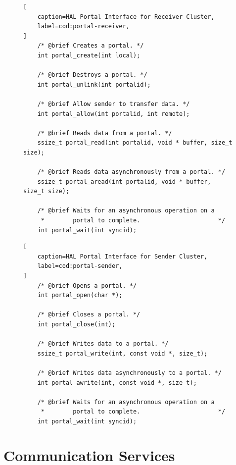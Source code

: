 
\begin{figure}[t]
\begin{lstlisting}[
    caption=HAL Portal Interface for Receiver Cluster,
    label=cod:portal-receiver,
]
	/* @brief Creates a portal. */
    int portal_create(int local);

	/* @brief Destroys a portal. */
    int portal_unlink(int portalid);

    /* @brief Allow sender to transfer data. */
    int portal_allow(int portalid, int remote);

    /* @brief Reads data from a portal. */
    ssize_t portal_read(int portalid, void * buffer, size_t size);

    /* @brief Reads data asynchronously from a portal. */
    ssize_t portal_aread(int portalid, void * buffer, size_t size);

    /* @brief Waits for an asynchronous operation on a
     *        portal to complete.                      */
    int portal_wait(int syncid);
\end{lstlisting}
\end{figure}

\begin{figure}[t]
\begin{lstlisting}[
    caption=HAL Portal Interface for Sender Cluster,
    label=cod:portal-sender,
]
    /* @brief Opens a portal. */
    int portal_open(char *);

	/* @brief Closes a portal. */
    int portal_close(int);

	/* @brief Writes data to a portal. */
    ssize_t portal_write(int, const void *, size_t);

    /* @brief Writes data asynchronously to a portal. */
    int portal_awrite(int, const void *, size_t);
    
    /* @brief Waits for an asynchronous operation on a
     *        portal to complete.                      */
    int portal_wait(int syncid);
\end{lstlisting}
\end{figure}

\section{Communication Services}

